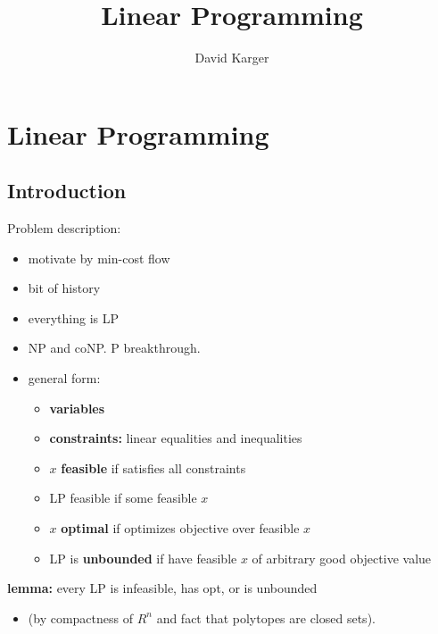 \documentclass{article}
\title{Linear Programming}
\author{David Karger}
\begin{document}

\section{Linear Programming}

\subsection{Introduction}

Problem description:
\begin{itemize}
\item motivate by min-cost flow
\item bit of history
\item everything is LP
\item NP and coNP.   P breakthrough.
\item general form: 
  \begin{itemize}
  \item {\bf variables}
  \item {\bf constraints:} linear equalities and inequalities
  \item $x$ {\bf feasible} if satisfies all constraints
  \item LP feasible if some feasible $x$
  \item $x$ {\bf optimal} if optimizes objective over feasible $x$
  \item LP is {\bf unbounded} if have feasible $x$ of arbitrary good
    objective value
  \end{itemize}
\end{itemize}

{\bf lemma:} every LP is infeasible, has opt, or is unbounded
\begin{itemize}
  \item  (by compactness of $R^n$ and fact that polytopes are closed sets).
\end{itemize}
\end{document}
